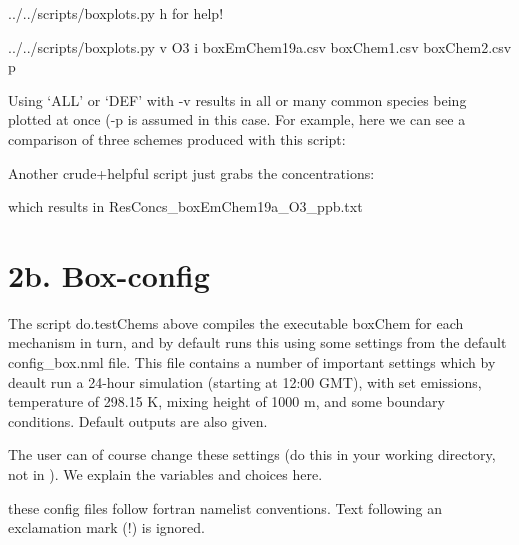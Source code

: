 \documentclass[a4paper,10pt,english]{sphinxmanual}
\begin{document}
\begin{sphinxVerbatim}[commandchars=\\\{\}]
../../scripts/boxplots.py \PYGZhy{}h     for help!

../../scripts/boxplots.py \PYGZhy{}v O3 \PYGZhy{}i boxEmChem19a.csv boxChem1.csv boxChem2.csv  \PYGZhy{}p
\end{sphinxVerbatim}

Using ‘ALL’ or ‘DEF’ with -v results in all or many common species being plotted at once (-p is assumed
in this case. For example, here we can see a comparison of three schemes produced with this script:


Another crude+helpful script just grabs the concentrations:

\begin{sphinxVerbatim}[commandchars=\\\{\}]
   
\end{sphinxVerbatim}

which results in ResConcs\_boxEmChem19a\_O3\_ppb.txt


\section{2b. Box-config}
\label{\detokenize{GenChemDoc_quickstart:b-box-config}}
The script do.testChems above compiles the executable boxChem for each mechanism in turn, and by default runs this using some settings from the default config\_box.nml file. This file contains a number of important settings which by deault run a 24-hour simulation (starting at 12:00 GMT), with set emissions, temperature of 298.15 K, mixing height of 1000 m, and some boundary conditions. Default outputs are also given.

The user can of course change these settings (do this in your working directory, not in ). We explain the variables and choices here.

 these config files follow fortran namelist conventions. Text following
an exclamation mark (!) is ignored.
\end{document}
